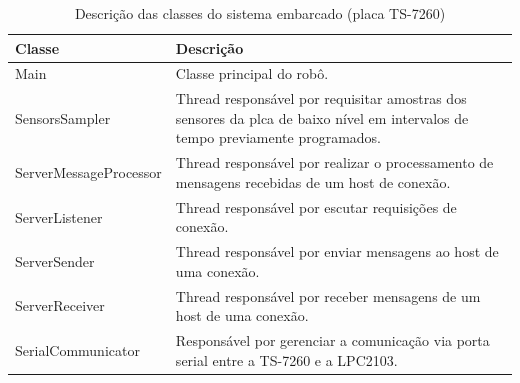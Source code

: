 \begin{table}[h]
  \centering
  \caption{Descrição das classes do sistema embarcado (placa TS-7260)}
  \begin{tabular}{p{6cm}p{8cm}}
    \toprule
    \textbf{Classe} & \textbf{Descrição} \\ 
    \midrule
   Main & Classe principal do robô. \\ \hline
   SensorsSampler & Thread responsável por requisitar amostras dos sensores da plca de baixo nível em intervalos de tempo previamente programados. \\ \hline
   ServerMessageProcessor & Thread responsável por realizar o processamento de mensagens recebidas de um host de conexão. \\ \hline
   ServerListener & Thread responsável por escutar requisições de conexão. \\ \hline
   ServerSender & Thread responsável por enviar mensagens ao host de uma conexão. \\ \hline
   ServerReceiver & Thread responsável por receber mensagens de um host de uma conexão. \\ \hline
   SerialCommunicator & Responsável por gerenciar a comunicação via porta serial entre a TS-7260 e a LPC2103.\\
    \bottomrule
  \end{tabular}%
  \label{tab:pacote_comunicacao}%
\end{table}%
